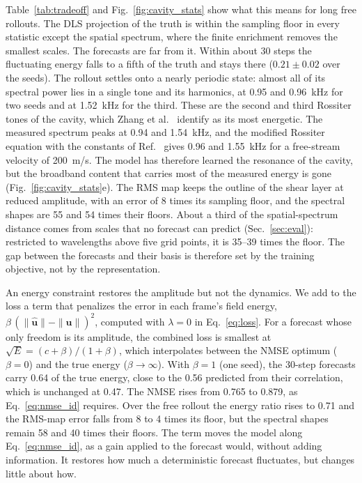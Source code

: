 \documentclass[conf]{new-aiaa}
\begin{document}
Table~\ref{tab:tradeoff} and Fig.~\ref{fig:cavity_stats} show what this means for long free rollouts. The DLS projection of the truth is within the sampling floor in every statistic except the spatial spectrum, where the finite enrichment removes the smallest scales. The forecasts are far from it. Within about 30 steps the fluctuating energy falls to a fifth of the truth and stays there ($0.21\pm0.02$ over the seeds). The rollout settles onto a nearly periodic state: almost all of its spectral power lies in a single tone and its harmonics, at 0.95 and 0.96~kHz for two seeds and at 1.52~kHz for the third. These are the second and third Rossiter tones of the cavity, which Zhang et al.~\cite{zhang2020samm} identify as its most energetic. The measured spectrum peaks at 0.94 and 1.54~kHz, and the modified Rossiter equation \cite{heller1971cavity} with the constants of Ref.~\cite{zhang2020samm} gives 0.96 and 1.55~kHz for a free-stream velocity of 200~m/s. The model has therefore learned the resonance of the cavity, but the broadband content that carries most of the measured energy is gone (Fig.~\ref{fig:cavity_stats}e). The RMS map keeps the outline of the shear layer at reduced amplitude, with an error of 8 times its sampling floor, and the spectral shapes are 55 and 54 times their floors. About a third of the spatial-spectrum distance comes from scales that no forecast can predict (Sec.~\ref{sec:eval}): restricted to wavelengths above five grid points, it is 35--39 times the floor. The gap between the forecasts and their basis is therefore set by the training objective, not by the representation.

An energy constraint restores the amplitude but not the dynamics. We add to the loss a term that penalizes the error in each frame's field energy, $\beta\,(\|\hat{\mathbf{u}}\|-\|\mathbf{u}\|)^2$, computed with $\lambda=0$ in Eq.~\eqref{eq:loss}. For a forecast whose only freedom is its amplitude, the combined loss is smallest at $\sqrt{E}=(c+\beta)/(1+\beta)$, which interpolates between the NMSE optimum ($\beta=0$) and the true energy ($\beta\rightarrow\infty$). With $\beta=1$ (one seed), the 30-step forecasts carry 0.64 of the true energy, close to the 0.56 predicted from their correlation, which is unchanged at 0.47. The NMSE rises from 0.765 to 0.879, as Eq.~\eqref{eq:nmse_id} requires. Over the free rollout the energy ratio rises to 0.71 and the RMS-map error falls from 8 to 4 times its floor, but the spectral shapes remain 58 and 40 times their floors. The term moves the model along Eq.~\eqref{eq:nmse_id}, as a gain applied to the forecast would, without adding information. It restores how much a deterministic forecast fluctuates, but changes little about how.
\end{document}
